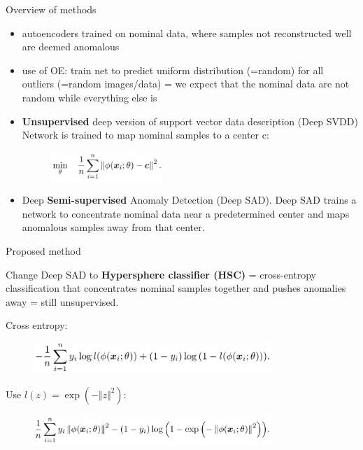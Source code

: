 \documentclass{beamer}
\begin{document}
\begin{frame}{Overview of methods}
\begin{itemize}
\item autoencoders trained on nominal data, where samples not reconstructed well are deemed anomalous

\item use of OE: train net to predict uniform distribution (=random) for all outliers (=random images/data) = we expect that the nominal data are not random while everything else is

\item \textbf{Unsupervised} deep version of support vector data description (Deep SVDD) Network is trained to map nominal samples to a center c: 
\begin{figure}[h]
\includegraphics[width=0.4\textwidth]{img/svdd}
\end{figure}

\item Deep \textbf{Semi-supervised} Anomaly Detection (Deep SAD). Deep SAD trains a network to concentrate nominal data near a predetermined center and maps anomalous samples away from that center.

\end{itemize}
\end{frame}
\begin{frame}{Proposed method}

Change Deep SAD to \textbf{Hypersphere classifier (HSC)} = cross-entropy classification that concentrates nominal samples together and pushes anomalies away = still unsupervised.

\vfill

Cross entropy:

\begin{figure}[h]
\includegraphics[width=0.8\textwidth]{img/eq1}
\end{figure}

Use $l(z) = \exp (- \Vert z \Vert ^2)$:
\begin{figure}[h]
\includegraphics[width=0.8\textwidth]{img/eq2}
\end{figure}
\end{frame}
\end{document}
